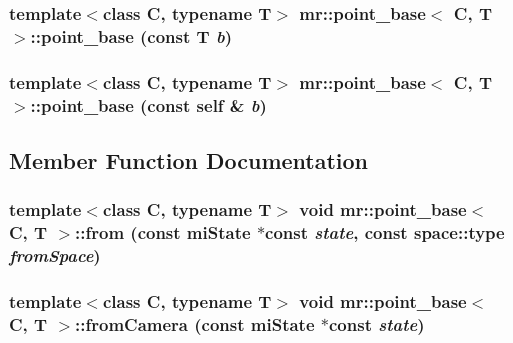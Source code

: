 \subsubsection{\setlength{\rightskip}{0pt plus 5cm}template$<$class C, typename T$>$ {\bf mr::point\_\-base}$<$ C, T $>$::{\bf point\_\-base} (const T {\em b})\hspace{0.3cm}{\tt  [inline]}}\label{structmr_1_1point__base_z75_7}


\subsubsection{\setlength{\rightskip}{0pt plus 5cm}template$<$class C, typename T$>$ {\bf mr::point\_\-base}$<$ C, T $>$::{\bf point\_\-base} (const {\bf self} \& {\em b})\hspace{0.3cm}{\tt  [inline]}}\label{structmr_1_1point__base_z76_0}




\subsection{Member Function Documentation}
\subsubsection{\setlength{\rightskip}{0pt plus 5cm}template$<$class C, typename T$>$ void {\bf mr::point\_\-base}$<$ C, T $>$::from (const mi\-State $\ast$const {\em state}, const {\bf space::type} {\em from\-Space})\hspace{0.3cm}{\tt  [inline]}}\label{structmr_1_1point__base_z74_15}


\subsubsection{\setlength{\rightskip}{0pt plus 5cm}template$<$class C, typename T$>$ void {\bf mr::point\_\-base}$<$ C, T $>$::from\-Camera (const mi\-State $\ast$const {\em state})\hspace{0.3cm}{\tt  [inline]}}\label{structmr_1_1point__base_z74_9}


